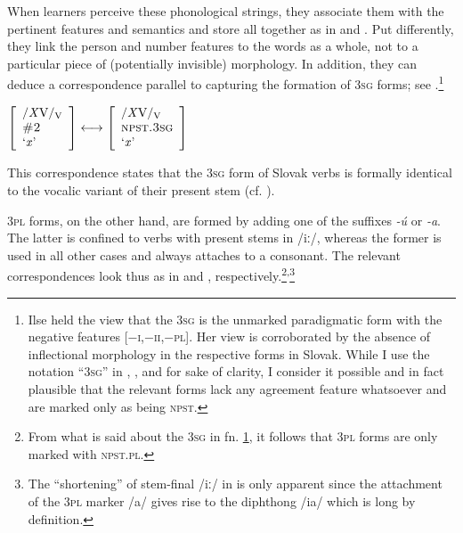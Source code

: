 \documentclass[output=paper,colorlinks,citecolor=brown]{langscibook}
\begin{document}
\noindent When learners perceive these phonological strings, they associate them with the pertinent features and semantics and store all together as in  and . Put differently, they link the person and number features to the words as a whole, not to a particular piece of (potentially invisible) morphology. In addition, they can deduce a correspondence parallel to  capturing the formation of \textsc{3sg} forms; see .\footnote{\label{fn:unmarkedness}Ilse \citeauthor{Zimmermann2019} held the view that the \textsc{3sg} is the unmarked paradigmatic form with the negative features {[$-$\textsc{i},$-$\textsc{ii},$-$\textsc{pl}]}. Her view is corroborated by the absence of inflectional morphology in the respective forms in Slovak. While I use the notation ``\textsc{3sg}'' in , , and  for sake of clarity, I consider it possible and in fact plausible that the relevant forms lack any agreement feature whatsoever and are marked only as being \textsc{npst}.}

\ea\label{ex:rule3SG}
$\left[
\begin{array}{l}
    \text{/\textit{X}V/\textsubscript{V}} \\
    \textsc{\#2} \\
    \text{`\textit{x}'}
\end{array}
\right] 
\longleftrightarrow
\left[
\begin{array}{l}
    \text{/\textit{X}V/\textsubscript{V}} \\
    \textsc{npst.3sg} \\
    \text{`\textit{x}'}
\end{array}
\right] $
\z

\noindent This correspondence states that the \textsc{3sg} form of Slovak verbs is formally identical to the vocalic variant of their present stem (cf. ).

\textsc{3pl} forms, on the other hand, are formed by adding one of the suffixes \textit{-ú} or \textit{-a}. The latter is confined to verbs with present stems in /iː/, whereas the former is used in all other cases and always attaches to a consonant. The relevant correspondences look thus as in  and , respectively.\footnote{From what is said about the \textsc{3sg} in fn. \ref{fn:unmarkedness}, it follows that \textsc{3pl} forms are only marked with \textsc{npst.pl}.}\textsuperscript{,}\footnote{The ``shortening'' of stem-final /iː/ in  is only apparent since the attachment of the \textsc{3pl} marker /a/ gives rise to the diphthong /ia/ which is long by definition.}
\end{document}
